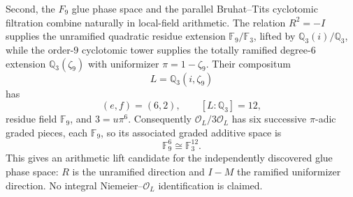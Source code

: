 Second, the $F_9$ glue phase space and the parallel Bruhat--Tits cyclotomic
filtration combine naturally in local-field arithmetic.  The relation
$R^2=-I$ supplies the unramified quadratic residue extension
$\mathbb F_9/\mathbb F_3$, lifted by $\mathbb Q_3(i)/\mathbb Q_3$, while the
order-$9$ cyclotomic tower supplies the totally ramified degree-$6$ extension
$\mathbb Q_3(\zeta_9)$ with uniformizer $\pi=1-\zeta_9$.  Their compositum
\[
L=\mathbb Q_3(i,\zeta_9)
\]
has
\[
(e,f)=(6,2),\qquad [L:\mathbb Q_3]=12,
\]
residue field $\mathbb F_9$, and $3=u\pi^6$.  Consequently
$\mathcal O_L/3\mathcal O_L$ has six successive $\pi$-adic graded pieces, each
$\mathbb F_9$, so its associated graded additive space is
\[
\boxed{\mathbb F_9^6\cong\mathbb F_3^{12}}.
\]
This gives an arithmetic lift candidate for the independently discovered glue
phase space: $R$ is the unramified direction and $I-M$ the ramified uniformizer
direction.  No integral Niemeier--$\mathcal O_L$ identification is claimed.
